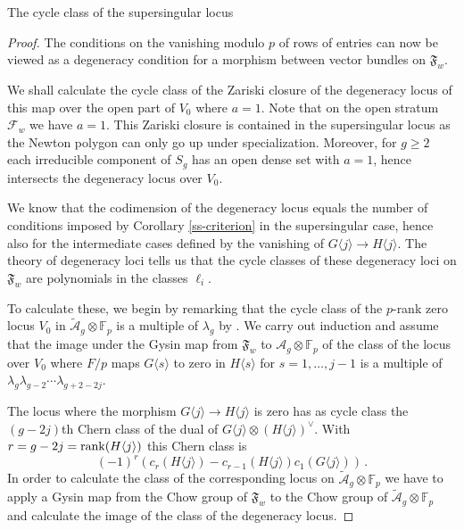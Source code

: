 \documentclass[11pt]{amsart}
\numberwithin{equation}{section}
\newcommand{\FF}{\mathbb F}
\theoremstyle{definition}
\theoremstyle{remark}
\begin{document}
\begin{section}{The cycle class of the supersingular locus}
\begin{proof}
The conditions on the vanishing modulo $p$ of rows of entries
can now be viewed as a degeneracy condition for a 
morphism between vector
bundles on $\mathfrak{F}_w$. 

We shall calculate the cycle class of the Zariski closure
of the degeneracy locus of this map over the open part of $V_0$
where $a=1$. Note that on the open stratum $\mathcal{F}_w$ we have
$a=1$.
This Zariski closure is contained in the supersingular locus
as the Newton polygon can only go up under specialization. Moreover,
for $g\geq 2$
each irreducible component of $S_g$ has an open dense set with
$a=1$, hence intersects the degeneracy locus over $V_0$.

We know that the codimension of the degeneracy locus equals the
number of conditions imposed by Corollary \ref{ss-criterion}
in the supersingular case, hence also for the intermediate cases
defined by the vanishing of $G\langle j \rangle \to H\langle j \rangle$.
The theory of degeneracy loci \cite{F-P1689} 
tells us that the cycle classes of these degeneracy
loci on $\mathfrak{F}_w$  are  polynomials in the classes $\ell_i$. 

To calculate these, we begin by remarking that the cycle class
of the $p$-rank zero locus $V_0$ in 
$\tilde{\mathcal{A}}_g \otimes {\FF}_p$
is a multiple of $\lambda_g$ by \cite{E-vdG}.
We carry out induction and assume that the image under the Gysin map from $\mathfrak{F}_w$ to $\mathcal{A}_g \otimes {\FF}_p$ of the class of the locus over $V_0$ 
where $F/p$ maps $G\langle s\rangle $ to zero in $H\langle s \rangle$
for $s=1,\ldots,j-1$ is a multiple of
$\lambda_g \lambda_{g-2} \cdots \lambda_{g+2-2j}$.  

The locus where the morphism 
$G\langle j\rangle \to H\langle j \rangle$ is zero has 
as cycle class  the $(g-2j)$th Chern class of the dual of
$G\langle j\rangle \otimes (H\langle j \rangle)^{\vee}$.
With $r=g-2j={\rm rank}(H\langle j \rangle)$ 
this Chern class is 
$$
(-1)^r(c_r(H\langle j\rangle) - 
c_{r-1}(H\langle j\rangle) c_1(G\langle j\rangle)) \, .
$$
In order to calculate the class of the corresponding locus
on $\tilde{\mathcal{A}}_g\otimes {\FF}_p$  we have to apply
a Gysin map from the Chow group of $\mathfrak{F}_w$ to the Chow group
of $\tilde{\mathcal{A}}_g \otimes {\FF}_p$  and calculate
the image of the class of the degeneracy locus. 


\end{proof}
\end{section}
\end{document}
